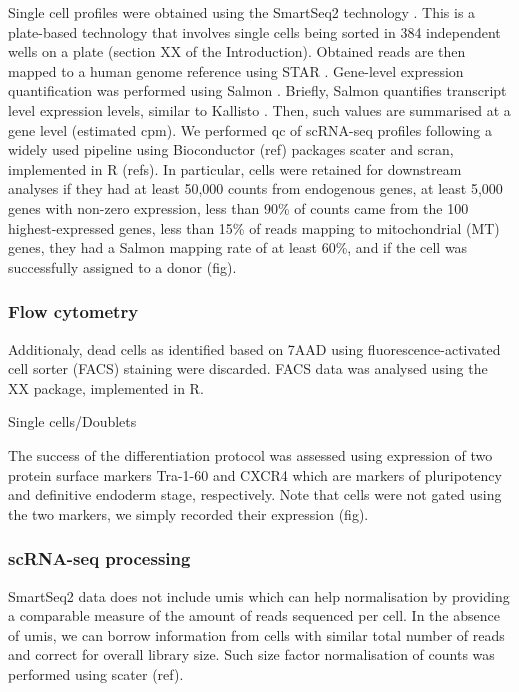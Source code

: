 Single cell profiles were obtained using the SmartSeq2 technology \cite{picelli2013smart}. 
This is a plate-based technology that involves single cells being sorted in 384 independent wells on a plate (section XX of the Introduction). 
Obtained reads are then mapped to a human genome reference using STAR \cite{dobin2013star}. 
Gene-level expression quantification was performed using Salmon \cite{patro2017salmon}. 
Briefly, Salmon quantifies transcript level expression levels, similar to Kallisto \cite{bray2016near}.
Then, such values are summarised at a gene level (estimated \gls{cpm}).
We performed \gls{qc} of scRNA-seq profiles following a widely used pipeline using Bioconductor (ref) packages scater \cite{mccarthy2017scater} and scran, implemented in R (refs).  
In particular, cells were retained for downstream analyses if they had at least 50,000 counts from endogenous genes, at least 5,000 genes with non-zero expression, less than 90\% of counts came from the 100 highest-expressed genes, less than 15\% of reads mapping to mitochondrial (MT) genes, they had a Salmon mapping rate of at least 60\%, and if the cell was successfully assigned to a donor (fig).  

\subsubsection{Flow cytometry}

Additionaly, dead cells as identified based on 7AAD using fluorescence-activated cell sorter (FACS) staining were discarded. 
FACS data was analysed using the XX package, implemented in R. 

Single cells/Doublets

The success of the differentiation protocol was assessed using expression of two protein surface markers Tra-1-60 and CXCR4 which are markers of pluripotency and definitive endoderm stage, respectively. 
Note that cells were not gated using the two markers, we simply recorded their expression (fig). 

\subsubsection{scRNA-seq processing}

SmartSeq2 data does not include \gls{umis} which can help normalisation by providing a comparable measure of the amount of reads sequenced per cell. 
In the absence of \gls{umis}, we can borrow information from cells with similar total number of reads and correct for overall library size. 
Such size factor normalisation of counts was performed using scater (ref). 

